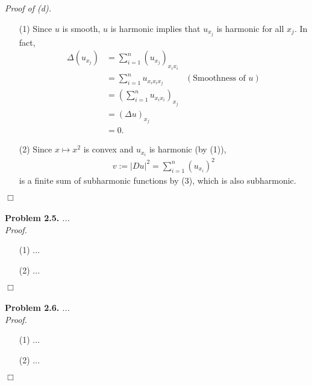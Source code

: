 \documentclass{article}
\begin{document}
\emph{Proof of (d).}
\begin{enumerate}
\item[(1)]
  Since $u$ is smooth,
  $u$ is harmonic implies that $u_{x_j}$ is harmonic for all $x_j$.
  In fact,
  \begin{align*}
    \Delta (u_{x_j})
    &= \sum_{i=1}^{n} (u_{x_j})_{x_i x_i} \\
    &= \sum_{i=1}^{n} u_{x_i x_i x_j}
      &(\text{Smoothness of $u$}) \\
    &= \left(\sum_{i=1}^{n} u_{x_i x_i}\right)_{x_j} \\
    &= \left(\Delta u\right)_{x_j} \\
    &= 0.
  \end{align*}

\item[(2)]
  Since $x \mapsto x^2$ is convex and $u_{x_i}$ is harmonic (by (1)),
  \begin{align*}
    v := |Du|^2 = \sum_{i=1}^n (u_{x_i})^2
  \end{align*}
  is a finite sum of subharmonic functions by (3),
  which is also subharmonic.
\end{enumerate}
$\Box$ \\\\






\textbf{Problem 2.5.}
\emph{...} \\



\emph{Proof.}
\begin{enumerate}
\item[(1)]
  ...

\item[(2)]
  ...
\end{enumerate}
$\Box$ \\\\






\textbf{Problem 2.6.}
\emph{...} \\



\emph{Proof.}
\begin{enumerate}
\item[(1)]
  ...

\item[(2)]
  ...
\end{enumerate}
$\Box$ \\\\
\end{document}
